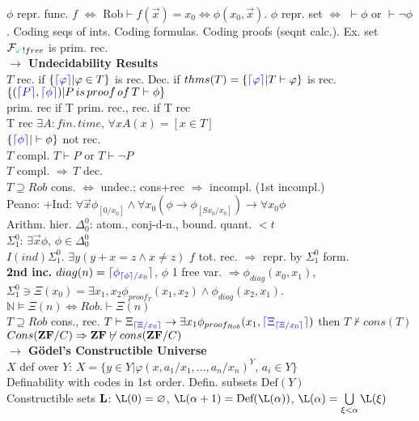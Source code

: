 \documentclass[9pt]{article}
\newcommand{\class}[1]{{\bf #1}}
\newcommand{\code}[1]{{\color{blue}\lceil#1\rceil}}
\newcommand{\mytitle}[1]{ {\bf $\rightarrow$ #1}\\}
\newcommand{\Def}{\mbox{Def}}
\begin{document}
\begin{multicols*}{2}
$\phi$ repr. func. $f$ $\Leftrightarrow$ Rob$\vdash f(\vec{x})=x_0\Leftrightarrow\phi(x_0,\vec{x})$. $\phi$ repr. set $\Leftrightarrow$ $\vdash\phi$ or $\vdash\neg\phi$. Coding seqs of ints. Coding formulas. Coding proofs (seqnt calc.). Ex. set $\mathcal{F}_{{\color{green}\checkmark}!free}$ is prim. rec.\\
\mytitle{Undecidability Results}
$T$ rec. if $\{\code{\varphi}|\varphi\in T\}$ is rec. Dec. if $thms(T)=\{\code{\varphi}|T\vdash\varphi\}$ is rec.\\
$\{(\code{P},\code{\phi})|P\,is\,proof\,of\,T\vdash\phi\}$\\
prim. rec if T prim. rec., rec. if T rec\\
T rec $\exists A\colon fin.\,time,\,\forall x A(x)=[x\in T]$\\
$\{\code{\phi}|\vdash\phi\}$ not rec.\\
$T$ compl. $T\vdash P$ or $T\vdash \neg P$\\
$T$ compl. $\Rightarrow\,T$ dec.\\
$T\supseteq Rob$ cons. $\Leftrightarrow$ undec.; cons+rec $\Rightarrow$ incompl. (1st incompl.)\\
Peano: +Ind: $\forall \vec{x}\phi_{[0/x_0]}\wedge\forall x_0(\phi\to \phi_{[Sx_0/x_0]})\to\forall x_0\phi$\\
Arithm. hier.
$\Delta_0^0$: atom., conj-d-n., bound. quant. $<t$\\
$\Sigma_1^0$: $\exists\vec{x}\phi$, $\phi\in\Delta_0^0$\\
$I(ind)\Sigma_1^0$. $\exists y(y+x=z\wedge x\neq z)$
$f$ tot. rec. $\Rightarrow$ repr. by $\Sigma_1^0$ form.\\
{\bf 2nd inc.} $diag(n)=\code{\phi_{\code{\phi}/x_0}}$, $\phi$ 1 free var. $\Rightarrow \phi_{diag}(x_0,x_1)$, $\Sigma_1^0\ni\Xi(x_0)=\exists x_1,x_2 \phi_{proof_T}(x_1, x_2)\wedge\phi_{diag}(x_2,x_1)$. $\mathbb{N}\models \Xi(n)\Leftrightarrow Rob.\vdash \Xi(n)$\\
$T\supseteq Rob$ cons., rec. $T\vdash \Xi_{\code{\Xi/x_0}}\to\exists x_1 \phi_{proof_{Rob}}(x_1, \code{\Xi_{\code{\Xi/x_0}}})$ then $T\not\vdash cons(T)$\\
$Cons(\class{ZF}/C)\Rightarrow \class{ZF}\not\vdash cons(\class{ZF}/C)$\\
\mytitle{G\"odel's Constructible Universe}
$X$ def over $Y$: $X=\{y\in Y|\varphi(x,a_1/x_1,...,a_n/x_n)^Y,\,a_i\in Y\}$\\
Definability with codes in 1st order. Defin. subsets $\Def(Y)$\\
Constructible sets $\class{L}$: $\L(0)=\varnothing$, $\L(\alpha+1)=\Def(\L(\alpha))$, $\L(\alpha)=\bigcup\limits_{\xi<\alpha}\L(\xi)$\\

\end{multicols*}
\end{document}
